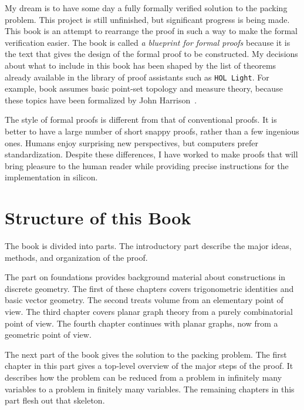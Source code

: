 My dream is to have some day a fully formally verified solution to the
packing problem.  This project is still unfinished, but significant progress is
being made.  This book is an attempt to rearrange the proof in such a
way to make the formal verification easier.  The book is called {\it a
  blueprint for formal proofs} because it is the text that gives the
design of the formal proof to be constructed.  My decisions about what
to include in this book has been shaped by the list of theorems
already available in the library of proof assistants such as {\tt HOL
  Light}.  For example, book assumes basic point-set topology and
measure theory, because these topics have been formalized by John
Harrison~\cite{unknown}.

The style of formal proofs is different from that of
conventional proofs.  It is better to have a large number of short
snappy proofs, rather than a few ingenious ones.  Humans enjoy
surprising new perspectives, but computers prefer standardization.
Despite these differences, I have worked to make proofs that
will bring pleasure  to the human reader while providing precise instructions
for the implementation in silicon.



\section*{Structure of this Book}

The book is divided into parts.
The introductory part describe the major ideas, methods, and
organization of the proof.  

The part on foundations provides background material about
constructions in discrete geometry.    The first
of these chapters
covers trigonometric identities and basic vector geometry.  The second
treats volume from an elementary point of view.  The third chapter
covers planar graph theory from a purely combinatorial point of view.
The fourth chapter continues with planar graphs, now from a 
geometric point of view.

The next part of the book gives the solution to the packing problem.
The first chapter in this part gives a top-level overview of the major
steps of the proof.  It describes how the problem can be reduced from
a problem in infinitely many variables to a problem in finitely many
variables.  The remaining chapters in this part flesh out that
skeleton.

